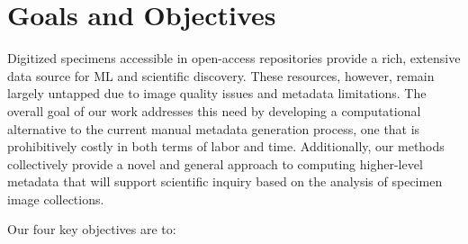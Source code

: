 \documentclass[conference]{IEEEtran}
\begin{document}
\section{Goals and Objectives}

Digitized specimens accessible in open-access repositories provide a rich,
extensive data source for ML and scientific discovery.
These resources, however, remain largely untapped due to image quality
issues and metadata limitations.
The overall goal of our work addresses this need by
developing a computational
alternative to the current manual metadata generation process, one that is
prohibitively costly in both terms of labor and time. Additionally, our
methods collectively provide a novel and general approach to computing
higher-level metadata that will support scientific inquiry based
on the analysis of specimen image collections.



Our four key objectives are to:
\end{document}
